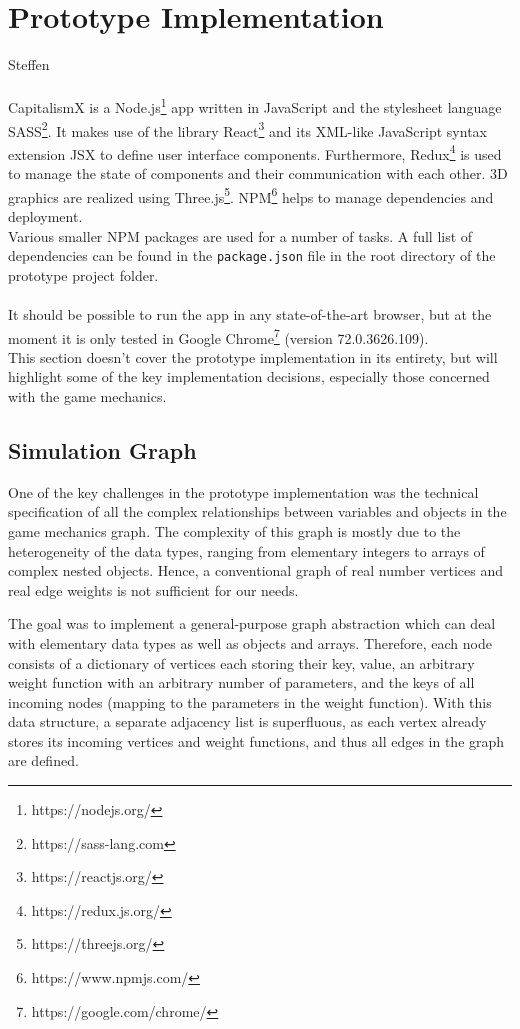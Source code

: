 \section{Prototype Implementation}
Steffen\\\\
CapitalismX is a Node.js\footnote{https://nodejs.org/} app written in JavaScript and the stylesheet language SASS\footnote{https://sass-lang.com}. It makes use of the library React\footnote{https://reactjs.org/} and its XML-like JavaScript syntax extension JSX to define user interface components. Furthermore, Redux\footnote{https://redux.js.org/} is used to manage the state of components and their communication with each other. 3D graphics are realized using Three.js\footnote{https://threejs.org/}. NPM\footnote{https://www.npmjs.com/} helps to manage dependencies and deployment.
\\
Various smaller NPM packages are used for a number of tasks. A full list of dependencies can be found in the \texttt{package.json} file in the root directory of the prototype project folder.\\\\
It should be possible to run the app in any state-of-the-art browser, but at the moment it is only tested in Google Chrome\footnote{https://google.com/chrome/} (version 72.0.3626.109).
\\
This section doesn't cover the prototype implementation in its entirety, but will highlight some of the key implementation decisions, especially those concerned with the game mechanics.

\subsection{Simulation Graph}

One of the key challenges in the prototype implementation was the technical specification of all the complex relationships between variables and objects in the game mechanics graph. The complexity of this graph is mostly due to the heterogeneity of the data types, ranging from elementary integers to arrays of complex nested objects. 
 Hence, a conventional graph of real number vertices and real edge weights is not sufficient for our needs.
 
 
The goal was to implement a general-purpose graph abstraction which can deal with elementary data types as well as objects and arrays.
Therefore, each node consists of a dictionary of vertices each storing their key, value, an arbitrary weight function with an arbitrary number of parameters, and the keys of all incoming nodes (mapping to the parameters in the weight function). With this data structure, a separate adjacency list is superfluous, as each vertex already stores its incoming vertices and weight functions, and thus all edges in the graph are defined.


